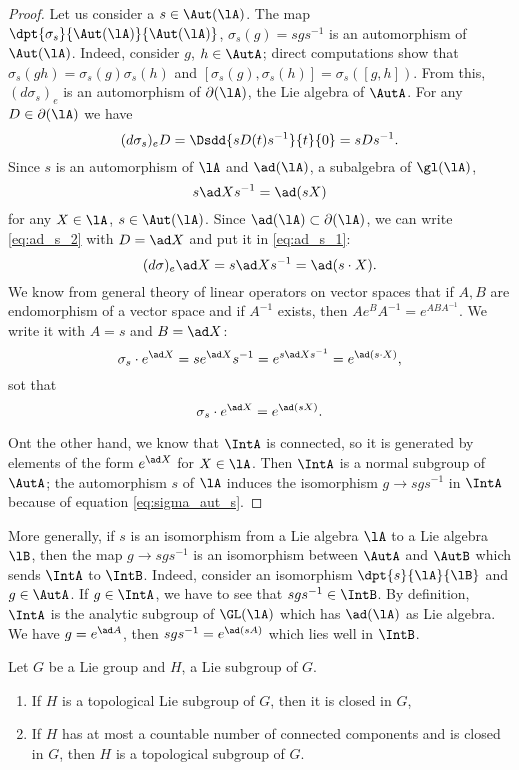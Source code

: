 \begin{proof}
Let us consider a $s\in\Aut(\lA)$. The map $\dpt{\sigma_s}{\Aut(\lA)}{\Aut(\lA)}$, $\sigma_s(g)=sgs^{-1}$ is an automorphism of $\Aut(\lA)$. Indeed, consider $g$, $h\in\AutA$; direct computations show that $\sigma_s(gh)=\sigma_s(g)\sigma_s(h)$ and $[\sigma_s(g),\sigma_s(h)]=\sigma_s([g,h])$. From this, $(d\sigma_s)_e$ is an automorphism of $\partial(\lA)$, the Lie algebra of $\AutA$. For any $D\in\partial(\lA)$ we have
\begin{equation}\label{eq:ad_s_2}
 (d\sigma_s)_eD=\Dsdd{ sD(t)s^{-1} }{t}{0}
             =sDs^{-1}.
\end{equation}
Since $s$ is an automorphism of $\lA$ and $\ad(\lA)$, a subalgebra of $\gl(\lA)$,
\begin{equation}\label{eq:ad_s_1}
  s\ad Xs^{-1}=\ad(sX)
\end{equation}
for any $X\in\lA$, $s\in\Aut(\lA)$. Since $\ad(\lA)\subset\partial(\lA)$, we can write \eqref{eq:ad_s_2} with $D=\ad X$ and put it in \eqref{eq:ad_s_1}:
\[
   (d\sigma)_e\ad X=s\ad Xs^{-1}=\ad(s\cdot X).
\]
We know from general theory of linear operators on vector spaces that if $A,B$ are endomorphism of a vector space and if $A^{-1}$ exists, then $Ae^BA^{-1}=e^{ABA^{-1}}$. We write it with $A=s$ and $B=\ad X$:
\[
  \sigma_s\cdot e^{\ad X}=se^{\ad X}s^{-1}=e^{s\ad Xs^{-1}}=e^{\ad(s\cdot X)},
\]
sot that
\begin{equation}\label{eq:sigma_aut_s}
  \sigma_s\cdot e^{\ad X}=e^{\ad(s X)}.
\end{equation}

Ont the other hand, we know that $\IntA$ is connected, so it is generated by elements of the form $e^{\ad X}$ for $X\in\lA$. Then $\IntA$ is a normal subgroup of $\AutA$; the automorphism $s$ of $\lA$ induces the isomorphism $g\to sgs^{-1}$ in $\IntA$ because of equation \eqref{eq:sigma_aut_s}.
\end{proof}

More generally, if $s$ is an isomorphism from a Lie algebra $\lA$ to a Lie algebra $\lB$, then the map $g\to sgs^{-1}$ is an isomorphism between $\AutA$ and $\AutB$ which sends $\IntA$ to $\IntB$. Indeed, consider an isomorphism $\dpt{s}{\lA}{\lB}$ and $g\in\AutA$. If $g\in\IntA$, we have to see that $sgs^{-1}\in\IntB$. By definition, $\IntA$ is the analytic subgroup of $\GL(\lA)$ which has $\ad(\lA)$ as Lie algebra. We have $g=e^{\ad A}$, then $sgs^{-1}=e^{\ad(sA)}$ which lies well in $\IntB$.

\begin{theorem}
Let $G$ be a Lie group and $H$, a Lie subgroup of $G$.
\begin{enumerate}
\item If $H$ is a topological Lie subgroup of $G$, then it is closed in $G$,
\item If $H$ has at most a countable number of connected components and is closed in $G$, then $H$ is a topological subgroup of $G$.
\end{enumerate}
\label{tho:H_ferme}
\end{theorem}

